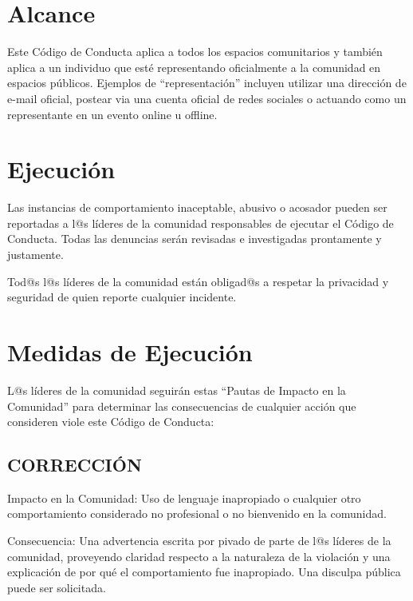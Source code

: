 \documentclass[
]{book}
\begin{document}
\hypertarget{alcance}{%
\section{Alcance}\label{alcance}}

Este Código de Conducta aplica a todos los espacios comunitarios y también aplica a un individuo que esté representando oficialmente a la comunidad en espacios públicos. Ejemplos de ``representación'' incluyen utilizar una dirección de e-mail oficial, postear via una cuenta oficial de redes sociales o actuando como un representante en un evento online u offline.

\hypertarget{ejecuciuxf3n}{%
\section{Ejecución}\label{ejecuciuxf3n}}

Las instancias de comportamiento inaceptable, abusivo o acosador pueden ser reportadas a l@s líderes de la comunidad responsables de ejecutar el Código de Conducta. Todas las denuncias serán revisadas e investigadas prontamente y justamente.

Tod@s l@s líderes de la comunidad están obligad@s a respetar la privacidad y seguridad de quien reporte cualquier incidente.

\hypertarget{medidas-de-ejecuciuxf3n}{%
\section{Medidas de Ejecución}\label{medidas-de-ejecuciuxf3n}}

L@s líderes de la comunidad seguirán estas ``Pautas de Impacto en la Comunidad'' para determinar las consecuencias de cualquier acción que consideren viole este Código de Conducta:

\hypertarget{correcciuxf3n}{%
\subsection{CORRECCIÓN}\label{correcciuxf3n}}

Impacto en la Comunidad: Uso de lenguaje inapropiado o cualquier otro comportamiento considerado no profesional o no bienvenido en la comunidad.

Consecuencia: Una advertencia escrita por pivado de parte de l@s líderes de la comunidad, proveyendo claridad respecto a la naturaleza de la violación y una explicación de por qué el comportamiento fue inapropiado. Una disculpa pública puede ser solicitada.
\end{document}
